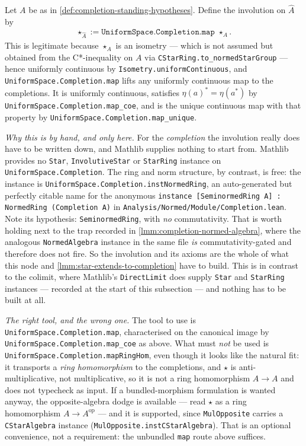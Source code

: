 \begin{definition}
    \label{def:completion-star}
    \leanok
    Let $A$ be as in \ref{def:completion-standing-hypotheses}. Define the involution on $\widehat{A}$ by
    \begin{align}
        \star_{\widehat{A}} := \texttt{UniformSpace.Completion.map } \star_{A}.
    \end{align}
    This is legitimate because $\star_A$ is an isometry --- which is not assumed but obtained from the C*-inequality on $A$ via \texttt{CStarRing.to\_normedStarGroup} --- hence uniformly continuous by \texttt{Isometry.uniformContinuous}, and \texttt{UniformSpace.Completion.map} lifts any uniformly continuous map to the completions. It is uniformly continuous, satisfies $\eta(a)^{*} = \eta(a^{*})$ by \texttt{UniformSpace.Completion.map\_coe}, and is the unique continuous map with that property by \texttt{UniformSpace.Completion.map\_unique}.

    \emph{Why this is by hand, and only here.} For the \emph{completion} the involution really does have to be written down, and Mathlib supplies nothing to start from. Mathlib provides no \texttt{Star}, \texttt{InvolutiveStar} or \texttt{StarRing} instance on \texttt{UniformSpace.Completion}. The ring and norm structure, by contrast, is free: the instance is \texttt{UniformSpace.Completion.instNormedRing}, an auto-generated but perfectly citable name for the anonymous \texttt{instance [SeminormedRing A] : NormedRing (Completion A)} in \texttt{Analysis/Normed/Module/Completion.lean}. Note its hypothesis: \texttt{SeminormedRing}, with \emph{no} commutativity. That is worth holding next to the trap recorded in \ref{lmm:completion-normed-algebra}, where the analogous \texttt{NormedAlgebra} instance in the same file \emph{is} commutativity-gated and therefore does not fire. So the involution and its axioms are the whole of what this node and \ref{lmm:star-extends-to-completion} have to build. This is in contrast to the colimit, where Mathlib's \texttt{DirectLimit} does supply \texttt{Star} and \texttt{StarRing} instances --- recorded at the start of this subsection --- and nothing has to be built at all.

    \emph{The right tool, and the wrong one.} The tool to use is \texttt{UniformSpace.Completion.map}, characterised on the canonical image by \texttt{UniformSpace.Completion.map\_coe} as above. What must \emph{not} be used is \texttt{UniformSpace.Completion.mapRingHom}, even though it looks like the natural fit: it transports a \emph{ring homomorphism} to the completions, and $\star$ is anti-multiplicative, not multiplicative, so it is not a ring homomorphism $A \to A$ and does not typecheck as input. If a bundled-morphism formulation is wanted anyway, the opposite-algebra dodge is available --- read $\star$ as a ring homomorphism $A \to A^{\mathrm{op}}$ --- and it is supported, since \texttt{MulOpposite} carries a \texttt{CStarAlgebra} instance (\texttt{MulOpposite.instCStarAlgebra}). That is an optional convenience, not a requirement: the unbundled \texttt{map} route above suffices.


\end{definition}
